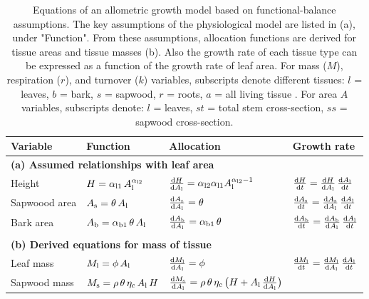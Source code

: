 \documentclass[10pt,twoside]{article}
\begin{document}
\newpage

\begin{table}[h!]
\caption{Equations of an allometric growth model based on functional-balance assumptions.
The key assumptions of the physiological model are listed in (a), under "Function". From these
assumptions, allocation functions are derived for tissue areas and tissue masses (b). Also
the growth rate of each tissue type can be expressed as a function of the growth rate of leaf area. For mass ($M$), respiration ($r$), and turnover ($k$)
variables, subscripts denote different tissues: \(l\) = leaves, \(b\) = bark, \(s\) = sapwood,
\(r\) = roots, \(a\) = all living tissue  . For area \(A\) variables, subscripts denote: \(l\) = leaves, \(st\) = total stem cross-section, \(ss\) = sapwood cross-section.}
\centering
\begin{tabular}{p{2.5cm}p{3.5cm}p{5cm}p{4cm} }\\ \hline
Variable & Function & Allocation & Growth rate\\ \hline
\multicolumn{4}{l}{\textbf{(a) Assumed relationships with leaf area}} \\
Height &
$H = \alpha_{{\rm l1}} \, A_{\rm l  }^{\alpha_{{\rm l2}}}$ &
$\frac{{\rm d}H}{{\rm d}A_{\rm l}} = \alpha_{{\rm l2}} \alpha_{{\rm l1}} A_{\rm l}^{\alpha_{{\rm l2}}-1}$ &
$\frac{{\rm d}H}{{\rm d}t} = \frac{{\rm d}H}{{\rm d}A_{\rm l}} \, \frac{{\rm d}A_{\rm l}}{{\rm d}t}$ \\
Sapwoood area &
$A_{\rm s} = \theta \, A_{\rm l}$ &
$\frac{{\rm d}A_{\rm s}}{{\rm d} A_{\rm l}} = \theta$ &
$\frac{{\rm d}A_{\rm s}}{{\rm d}t} = \frac{{\rm d}A_{\rm s}}{{\rm d} A_{\rm l}} \, \frac{{\rm d}A_{\rm l}}{{\rm d}t}$ \\
Bark area &
$A_{\rm b} = \alpha_{{\rm b1}} \, \theta \, A_{\rm l}$ &
$\frac{{\rm d}A_{\rm b}}{{\rm d} A_{\rm l}} = \alpha_{{\rm b1}} \, \theta$ &
$\frac{{\rm d}A_{\rm b}}{{\rm d}t} = \frac{{\rm d}A_{\rm b}}{{\rm d} A_{\rm l}} \, \frac{{\rm d}A_{\rm l}}{{\rm d}t}$ \\ \\
\multicolumn{4}{l}{\textbf{(b) Derived equations for mass of tissue }} \\
Leaf mass &
$M_{\rm l} = \phi \, A_{\rm l} $ &
$\frac{{\rm d}M_{\rm l}}{{\rm d}A_{\rm l}} = \phi$ &
$\frac{{\rm d}M_{\rm l}}{{\rm d}t} = \frac{{\rm d}M_{\rm l}}{{\rm d}A_{\rm l}} \, \frac{{\rm d}A_{\rm l}}{{\rm d}t}$ \\
Sapwood mass &
$M_{\rm s} = \rho \, \theta \, \eta_{\rm c} \, A_{\rm l} \, H $ &
$\frac{{\rm d}M_{\rm s}}{{\rm d}A_{\rm l}} = \rho \, \theta \, \eta_{\rm c} \, \big(H + A_{\rm l} \, \frac{{\rm d}H}{{\rm d}A_{\rm l}} \big)$ &

\end{tabular}
\end{table}
\end{document}
